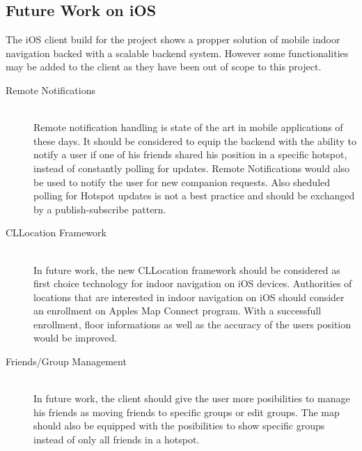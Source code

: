 \subsection{Future Work on iOS}
The iOS client build for the project shows a propper solution of mobile indoor navigation backed with a scalable backend system. However some functionalities may be added to the client as they have been out of scope to this project.

\begin{description}
  \item[Remote Notifications] \hfill \\
  Remote notification handling is state of the art in mobile applications of these days. It should be considered to equip the backend with the ability to notify a user if one of his friends shared his position in a specific hotspot, instead of constantly polling for updates. Remote Notifications would also be used to notify the user for new companion requests. Also sheduled polling for Hotspot updates is not a best practice and should be exchanged by a publish-subscribe pattern.
  \item[CLLocation Framework] \hfill \\
  In future work, the new CLLocation framework should be considered as first choice technology for indoor navigation on iOS devices. Authorities of locations that are interested in indoor navigation on iOS should consider an enrollment on Apples Map Connect program. With a successfull enrollment, floor informations as well as the accuracy of the users position would be improved.
  \item[Friends/Group Management] \hfill \\
  In future work, the client should give the user more posibilities to manage his friends as moving friends to specific groups or edit groups. The map should also be equipped with the posibilities to show specific groups instead of only all friends in a hotspot.
  
\end{description}